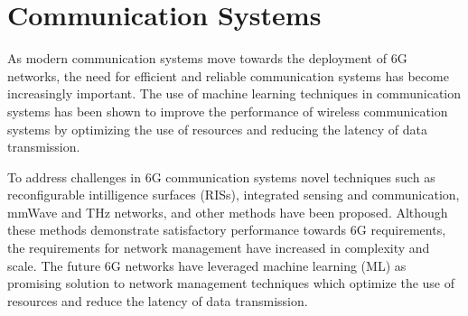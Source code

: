 \section{Communication Systems}
As modern communication systems move towards the deployment of 6G networks, the need for efficient and reliable communication systems has become increasingly important. The use of machine learning techniques in communication systems has been shown to improve the performance of wireless communication systems by optimizing the use of resources and reducing the latency of data transmission.

To address challenges in 6G communication systems novel techniques such as reconfigurable intilligence surfaces (RISs), integrated sensing and communication, mmWave and THz networks, and other methods have been proposed. \cite{zhou2023survey} Although these methods demonstrate satisfactory performance towards 6G requirements, the requirements for network management have increased in complexity and scale. The future 6G networks have leveraged machine learning (ML) as promising solution to network management techniques which optimize the use of resources and reduce the latency of data transmission. \cite{zhou2024large} 


